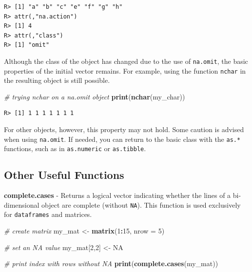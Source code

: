 \documentclass[
  12pt,
]{book}
\newenvironment{Shaded}{\begin{snugshade}}{\end{snugshade}}
\newcommand{\CommentTok}[1]{\textcolor[rgb]{0.37,0.37,0.37}{\textit{#1}}}
\newcommand{\DataTypeTok}[1]{\textcolor[rgb]{0.27,0.27,0.27}{#1}}
\newcommand{\DecValTok}[1]{\textcolor[rgb]{0.06,0.06,0.06}{#1}}
\newcommand{\KeywordTok}[1]{\textcolor[rgb]{0.27,0.27,0.27}{\textbf{#1}}}
\newcommand{\NormalTok}[1]{#1}
\newcommand{\OperatorTok}[1]{\textcolor[rgb]{0.43,0.43,0.43}{\textbf{#1}}}
\newcommand{\OtherTok}[1]{\textcolor[rgb]{0.37,0.37,0.37}{#1}}
\newcommand{\StringTok}[1]{\textcolor[rgb]{0.5,0.5,0.5}{#1}}
\begin{document}
\begin{verbatim}
R> [1] "a" "b" "c" "e" "f" "g" "h"
R> attr(,"na.action")
R> [1] 4
R> attr(,"class")
R> [1] "omit"
\end{verbatim}

Although the class of the object has changed due to the use of \texttt{na.omit}, the basic properties of the initial vector remains. For example, using the function \texttt{nchar} in the resulting object is still possible.

\begin{Shaded}
\begin{Highlighting}[]
\CommentTok{# trying nchar on a na.omit object}
\KeywordTok{print}\NormalTok{(}\KeywordTok{nchar}\NormalTok{(my_char))}
\end{Highlighting}
\end{Shaded}

\begin{verbatim}
R> [1] 1 1 1 1 1 1 1
\end{verbatim}

For other objects, however, this property may not hold. Some caution is advised when using \texttt{na.omit}. If needed, you can return to the basic class with the \texttt{as.*} functions, such as in \texttt{as.numeric} or \texttt{as.tibble}.

\hypertarget{other-useful-functions-6}{%
\subsection{Other Useful Functions}\label{other-useful-functions-6}}

\textbf{complete.cases} - Returns a logical vector indicating whether the lines of a bi-dimensional object are complete (without \texttt{NA}). This function is used exclusively for \texttt{dataframes} and matrices. 

\begin{Shaded}
\begin{Highlighting}[]
\CommentTok{# create matrix}
\NormalTok{my_mat <-}\StringTok{ }\KeywordTok{matrix}\NormalTok{(}\DecValTok{1}\OperatorTok{:}\DecValTok{15}\NormalTok{, }\DataTypeTok{nrow =} \DecValTok{5}\NormalTok{)}

\CommentTok{# set an NA value}
\NormalTok{my_mat[}\DecValTok{2}\NormalTok{,}\DecValTok{2}\NormalTok{] <-}\StringTok{ }\OtherTok{NA}

\CommentTok{# print index with rows without NA}
\KeywordTok{print}\NormalTok{(}\KeywordTok{complete.cases}\NormalTok{(my_mat))}
\end{Highlighting}
\end{Shaded}
\end{document}
